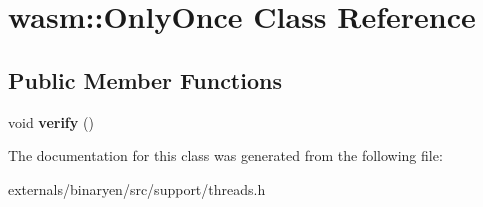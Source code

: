 \hypertarget{classwasm_1_1_only_once}{}\section{wasm\+:\+:Only\+Once Class Reference}
\label{classwasm_1_1_only_once}
\subsection*{Public Member Functions}
\begin{DoxyCompactItemize}
\item 
\mbox{\label{classwasm_1_1_only_once_a4c5d1bc01092a7ec70cbba2af513141a}} 
void {\bfseries verify} ()
\end{DoxyCompactItemize}


The documentation for this class was generated from the following file\+:\begin{DoxyCompactItemize}
\item 
externals/binaryen/src/support/threads.\+h\end{DoxyCompactItemize}
